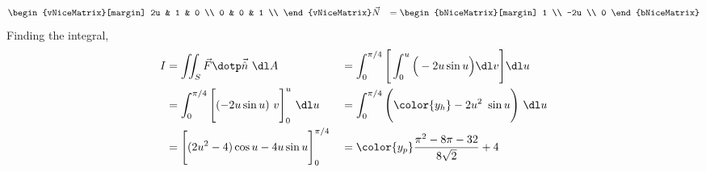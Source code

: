 \begin{enumerate}
\begin{align}
\begin{vNiceMatrix}[margin]
                                2u            & 1             & 0             \\
                                0             & 0             & 1             \\
                            \end{vNiceMatrix} &
              \vec{N}   & = \begin{bNiceMatrix}[margin]
                                1 \\ -2u \\ 0
                            \end{bNiceMatrix}
          \end{align}
          Finding the integral,
          \begin{align}
              I       & = \iint_S \vec{F} \dotp \vec{\hat{n}}\ \dl A            &
                      & = \int_{0}^{\pi/4}
              \Bigg[\int_{0}^{u} \Big( -2u \sin u\Big)
              \dl v \Bigg] \dl u                                                  \\
                      & = \int_{0}^{\pi/4} \Bigg[ (-2u\sin u)\ v \Bigg]_{0}^{u}
              \ \dl u &
                      & = \int_{0}^{\pi/4}
              \Bigg( {\color{y_h} -2u^2\ \sin u} \Bigg)\ \dl u                    \\
                      & = \Bigg[ (2u^2 - 4)\cos u - 4u\sin u \Bigg]_{0}^{\pi/4} &
                      & = \color{y_p} \frac{\pi^2 - 8\pi - 32}{8\sqrt{2}} + 4
          \end{align}


\end{enumerate}

